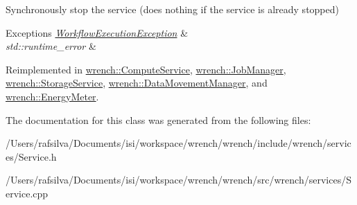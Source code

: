 Synchronously stop the service (does nothing if the service is already stopped) 


\begin{DoxyExceptions}{Exceptions}
{\em \hyperlink{classwrench_1_1_workflow_execution_exception}{Workflow\+Execution\+Exception}} & \\
\hline
{\em std\+::runtime\+\_\+error} & \\
\hline
\end{DoxyExceptions}


Reimplemented in \hyperlink{classwrench_1_1_compute_service_a289d4a0c5254772575340095b73cf7d4}{wrench\+::\+Compute\+Service}, \hyperlink{classwrench_1_1_job_manager_af9c85f6a54e26f115fa09ef1c9327aa7}{wrench\+::\+Job\+Manager}, \hyperlink{classwrench_1_1_storage_service_a1267ad1722291f56532c283658f31acc}{wrench\+::\+Storage\+Service}, \hyperlink{classwrench_1_1_data_movement_manager_a72fc97280a6f1f475e168c1f71ec5f70}{wrench\+::\+Data\+Movement\+Manager}, and \hyperlink{classwrench_1_1_energy_meter_ab5191f00d7af7cff9cecb664d2e784d8}{wrench\+::\+Energy\+Meter}.



The documentation for this class was generated from the following files\+:\begin{DoxyCompactItemize}
\item 
/\+Users/rafsilva/\+Documents/isi/workspace/wrench/wrench/include/wrench/services/Service.\+h\item 
/\+Users/rafsilva/\+Documents/isi/workspace/wrench/wrench/src/wrench/services/Service.\+cpp\end{DoxyCompactItemize}
